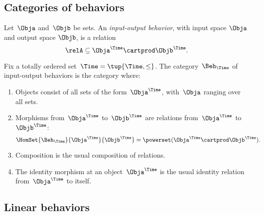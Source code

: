     \subsection{Categories of behaviors}

    \begin{definition}
        Let~$\Obja$ and~$\Objb$ be sets.
        An \emph{input-output behavior}, with input space $\Obja$ and output space $\Objb$, is a relation
        \begin{equation*}
            \relA \subseteq \Obja^\Time \cartprod \Objb^\Time.
        \end{equation*}
    \end{definition}

    \begin{definition}
        Fix a totally ordered set~$\Time = \tup{\Time, \leq}$.
        The category~$\Beh_\Time$ of input-output behaviors is the category where:
        \begin{enumerate}
            \item Objects consist of all sets of the form~$\Obja^\Time$, with~$\Obja$ ranging over all sets.
            \item Morphisms from~$\Obja^\Time$ to~$\Objb^\Time$ are relations from~$\Obja^\Time$ to~$\Objb^\Time$:
                  \begin{equation}
                      \HomSet{\Beh_\Time}{\Obja^\Time}{\Objb^\Time} = \powerset (\Obja^\Time \cartprod \Objb^\Time).
                  \end{equation}
            \item Composition is the usual composition of relations.
            \item The identity morphism at an object~$\Obja^\Time$ is the usual identity relation from~$\Obja^\Time$ to itself.
        \end{enumerate}
    \end{definition}




\subsection{Linear behaviors}

